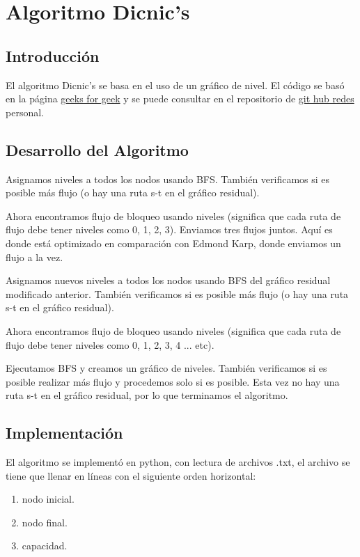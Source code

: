\documentclass{report}
\begin{document}
\tableofcontents
\chapter{Algoritmo Dicnic's}

\section{Introducción}
El algoritmo Dicnic's se basa en el uso de un gráfico de nivel. El código se basó en la página \href{https://www.geeksforgeeks.org/dinics-algorithm-maximum-flow/}{geeks for geek} y se puede consultar en el repositorio de \href{https://github.com/arnoldae9/redes.git}{git hub redes} personal.

\section{Desarrollo del Algoritmo}
Asignamos niveles a todos los nodos usando BFS. También verificamos si es posible más flujo (o hay una ruta s-t en el gráfico residual). 

Ahora encontramos flujo de bloqueo usando niveles (significa que cada ruta de flujo debe tener niveles como 0, 1, 2, 3). Enviamos tres flujos juntos. Aquí es donde está optimizado en comparación con Edmond Karp, donde enviamos un flujo a la vez.

Asignamos nuevos niveles a todos los nodos usando BFS del gráfico residual modificado anterior. También verificamos si es posible más flujo (o hay una ruta s-t en el gráfico residual). 

Ahora encontramos flujo de bloqueo usando niveles (significa que cada ruta de flujo debe tener niveles como 0, 1, 2, 3, 4 ...  etc).

Ejecutamos BFS y creamos un gráfico de niveles. También verificamos si es posible realizar más flujo y procedemos solo si es posible. Esta vez no hay una ruta s-t en el gráfico residual, por lo que terminamos el algoritmo.

\section{Implementación}
El algoritmo se implementó en python, con lectura de archivos .txt, el archivo se tiene que llenar en líneas con el siguiente orden horizontal: 
\begin{enumerate}
\item nodo inicial.
\item nodo final.
\item capacidad.
\end{enumerate}
\end{document}
